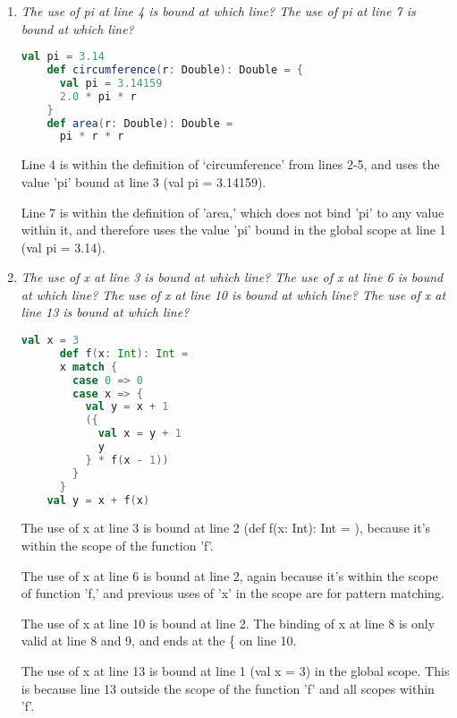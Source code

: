 \message{ !name(lab1-writeup.tex)}\documentclass[a4paper, 10pt]{article}
\begin{document}
\begin{enumerate}[label=(\alph*)]

\item\textit{The use of pi at line 4 is bound at which line? The use of pi at line 7 is bound at which line?}

  \begin{lstlisting}[language=Scala]
    val pi = 3.14
    def circumference(r: Double): Double = {
      val pi = 3.14159
      2.0 * pi * r
    }
    def area(r: Double): Double =
      pi * r * r
  \end{lstlisting}

  \vspace{0.2in}

    \large{Line 4 is within the definition of `circumference' from lines 2-5, and uses the value 'pi' bound at line 3 (val pi = 3.14159).

    Line 7 is within the definition of 'area,' which does not bind 'pi' to any value within it, and therefore uses the value 'pi' bound in the global scope at line 1 (val pi = 3.14).}

    \vspace{0.2in}

  \item
    \textit{The use of x at line 3 is bound at which line? The use of x at line 6 is bound at which line? The use of x at line 10 is bound at which line? The use of x at line 13 is bound at which line?}

    \begin{lstlisting}[language=Scala]
      val x = 3
      def f(x: Int): Int =
      x match {
        case 0 => 0
        case x => {
          val y = x + 1
          ({
            val x = y + 1
            y
          } * f(x - 1))
        }
      }
    val y = x + f(x)
  \end{lstlisting}

  \vspace{0.2in}

  \large{The use of x at line 3 is bound at line 2 (def f(x: Int): Int = ), because it's within the scope of the function 'f'.

  The use of x at line 6 is bound at line 2, again because it's within the scope of function 'f,' and previous uses of 'x' in the scope are for pattern matching.

  The use of x at line 10 is bound at line 2. The binding of x at line 8 is only valid at line 8 and 9, and ends at the \{ on line 10.

  The use of x at line 13 is bound at line 1 (val x = 3) in the global scope. This is because line 13 outside the scope of the function 'f' and all scopes within 'f'.}

  \vspace{0.2in}

\end{enumerate}
\end{document}
